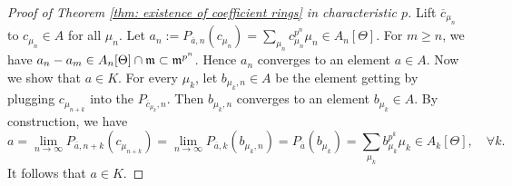 \begin{proof}[Proof of Theorem \ref{thm: existence of coefficient rings} in characteristic \(p\)]
            Lift \(\overline{c}_{\mu_n}\) to \(c_{\mu_n} \in A\) for all \(\mu_n\).
            Let \(a_n := P_{\overline{a},n}(c_{\mu_n}) = \sum_{\mu_n} c_{\mu_n}^{p^n} \mu_n \in A_n[\Theta]\).
            For \(m\geq n\), we have \(a_n - a_m \in A_n[\Theta] \cap {\mathfrak{m}} \subset {\mathfrak{m}}^{p^n}\).
            Hence \(a_n\) converges to an element \(a \in A\).
            Now we show that \(a \in K\).
            For every \(\mu_k\), let \(b_{\mu_k,n} \in A\) be the element getting by plugging \(c_{\mu_{n+k}}\) into the \(P_{\overline{c}_{\mu_k},n}\).
            Then \(b_{\mu_k,n}\) converges to an element \(b_{\mu_k} \in A\).
            By construction, we have
            \[ a = \lim_{n \to \infty} P_{\overline{a},n+k}(c_{\mu_{n+k}}) = \lim_{n \to \infty} P_{\overline{a},k}(b_{\mu_k,n}) = P_{\overline{a}}(b_{\mu_k}) = \sum_{\mu_k} b_{\mu_k}^{p^k} \mu_k \in A_k[\Theta],\quad \forall k. \] 
            It follows that \(a \in K\).
        \end{proof}

